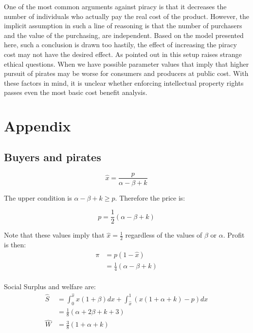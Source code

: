 \documentclass[12pt]{report}
\numberwithin{equation}{section}
\begin{document}
One of the most common arguments against piracy is that it decreases the number of individuals who actually pay the real cost of the product.  However, the implicit assumption in such a line of reasoning is that the number of purchasers and the value of the purchasing, are independent. Based on the model presented here, such a conclusion is drawn too hastily, the effect of increasing the piracy cost may not have the desired effect. As pointed out in \cite{CRP91} this setup raises strange ethical questions. When we have possible parameter values that imply that higher pursuit of pirates may be worse for consumers and producers at public cost. With these factors in mind, it is unclear whether enforcing intellectual property rights passes even the most basic cost benefit analysis.

\newpage
\section{Appendix}
\subsection{Buyers and pirates}
\begin{equation*}
\hat{x} = \frac{p}{\alpha-\beta + k}
\end{equation*}

The upper condition is $\alpha-\beta+k \geq p$. Therefore the price is:

\begin{equation*}
p = \frac{1}{2}\left(
\alpha-\beta+k
\right)
\end{equation*}

Note that these values imply that $\hat{x} = \frac{1}{2}$ regardless of the values of $\beta$ or $\alpha$. Profit is then:
\begin{align*}
\pi &= p(1-\hat{x}) \\
&=  \frac{1}{4}\left(
\alpha-\beta+k
\right)  \\
\end{align*}

Social Surplus and welfare are:
\begin{align*}
\hat{S} &= \int_0^{\hat{x}}x(1+\beta)dx+
\int_{\hat{x}}^{1}\left( x(1+\alpha+k)-p \right)dx \\
&= \frac{1}{8} (\alpha+2 \beta+k+3) \\
\hat{W} &= \frac{3}{8} \left( 1 + \alpha +k
\right)
\end{align*}
\end{document}
